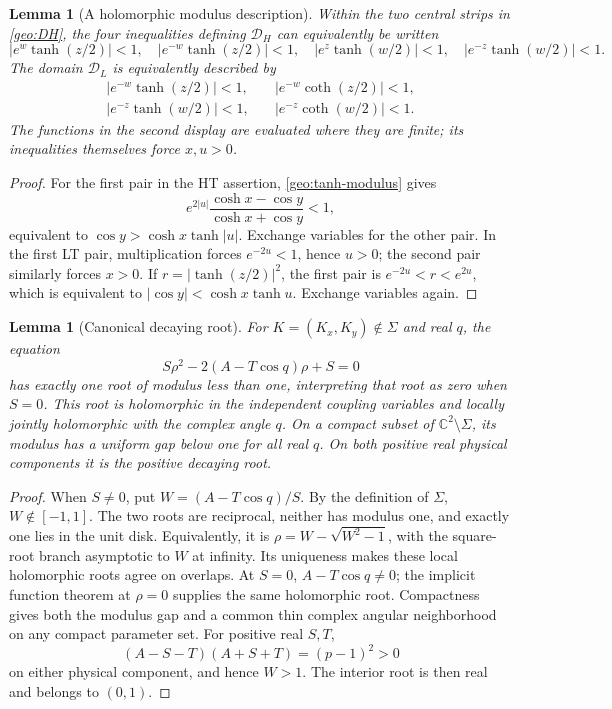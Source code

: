 \documentclass[11pt]{article}
\numberwithin{equation}{section}
\newtheorem{lemma}[theorem]{Lemma}
\theoremstyle{definition}
\newcommand{\C}{\mathbb C}
\renewcommand{\DH}{\mathcal D_H}
\newcommand{\DL}{\mathcal D_L}
\begin{document}
\begin{lemma}[A holomorphic modulus description]
\label{geo:holomorphic-inequalities}
Within the two central strips in \eqref{geo:DH}, the four
inequalities defining \(\DH\) can equivalently be written
\[
 |e^w\tanh(z/2)|<1,\quad |e^{-w}\tanh(z/2)|<1,\quad
 |e^z\tanh(w/2)|<1,\quad |e^{-z}\tanh(w/2)|<1.
\]
The domain \(\DL\) is equivalently described by
\[
 \begin{split}
 |e^{-w}\tanh(z/2)|<1,\quad &|e^{-w}\coth(z/2)|<1,\\
 |e^{-z}\tanh(w/2)|<1,\quad &|e^{-z}\coth(w/2)|<1 .
 \end{split}
\]
The functions in the second display are evaluated where they
are finite; its inequalities themselves force \(x,u>0\).
\end{lemma}

\begin{proof}
For the first pair in the HT assertion,
\eqref{geo:tanh-modulus} gives
\[
 e^{2|u|}\frac{\cosh x-\cos y}{\cosh x+\cos y}<1,
\]
equivalent to \(\cos y>\cosh x\tanh|u|\).  Exchange variables
for the other pair.  In the first LT pair, multiplication
forces \(e^{-2u}<1\), hence \(u>0\); the second pair similarly
forces \(x>0\).  If
\(r=|\tanh(z/2)|^2\), the first pair is
\(e^{-2u}<r<e^{2u}\), which is equivalent to
\(|\cos y|<\cosh x\tanh u\).  Exchange variables again.
\end{proof}

\begin{lemma}[Canonical decaying root]\label{geo:canonical-root}
For \(K=(K_x,K_y)\notin\Sigma\) and real \(q\), the equation
\begin{equation}\label{geo:root-equation}
               S\rho^2-2(A-T\cos q)\rho+S=0
\end{equation}
has exactly one root of modulus less than one, interpreting
that root as zero when \(S=0\).  This root is holomorphic in
the independent coupling variables and locally jointly
holomorphic with the complex angle \(q\).  On a compact
subset of \(\C^2\setminus\Sigma\), its modulus has a uniform
gap below one for all real \(q\).  On both positive real
physical components it is the positive decaying root.
\end{lemma}

\begin{proof}
When \(S\ne0\), put \(W=(A-T\cos q)/S\).
By the definition of \(\Sigma\), \(W\notin[-1,1]\).
The two roots are reciprocal, neither has modulus one,
and exactly one lies in the unit disk.  Equivalently, it is
\(\rho=W-\sqrt{W^2-1}\), with the square-root branch
asymptotic to \(W\) at infinity.  Its uniqueness makes these
local holomorphic roots agree on overlaps.  At \(S=0\),
\(A-T\cos q\ne0\); the implicit function theorem at
\(\rho=0\) supplies the same holomorphic root.
Compactness gives both the modulus gap and a common thin
complex angular neighborhood on any compact parameter set.
For positive real \(S,T\),
\[
              (A-S-T)(A+S+T)=(p-1)^2>0
\]
on either physical component, and hence \(W>1\).
The interior root is then real and belongs to \((0,1)\).
\end{proof}
\end{document}
